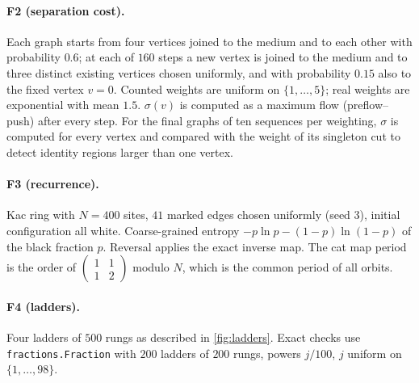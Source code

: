 \documentclass[10pt,twocolumn,a4paper]{article}
\newcommand{\sep}{\sigma}
\begin{document}
\paragraph{F2 (separation cost).} Each graph starts from four vertices
joined to the medium and to each other with probability $0.6$; at each of
$160$ steps a new vertex is joined to the medium and to three distinct
existing vertices chosen uniformly, and with probability $0.15$ also to the
fixed vertex $v=0$. Counted weights are uniform on $\{1,\dots,5\}$; real
weights are exponential with mean $1.5$. $\sep(v)$ is computed as a maximum
flow (preflow--push) after every step. For the final graphs of ten sequences
per weighting, $\sep$ is computed for every vertex and compared with the
weight of its singleton cut to detect identity regions larger than one
vertex.

\paragraph{F3 (recurrence).} Kac ring with $N=400$ sites, $41$ marked edges
chosen uniformly (seed 3), initial configuration all white. Coarse-grained
entropy $-p\ln p-(1-p)\ln(1-p)$ of the black fraction $p$. Reversal applies
the exact inverse map. The cat map period is the order of
$\left(\begin{smallmatrix}1&1\\1&2\end{smallmatrix}\right)$ modulo $N$, which
is the common period of all orbits.

\paragraph{F4 (ladders).} Four ladders of $500$ rungs as described in
\cref{fig:ladders}. Exact checks use \texttt{fractions.Fraction} with $200$
ladders of $200$ rungs, powers $j/100$, $j$ uniform on $\{1,\dots,98\}$.

\sloppy


\end{document}
